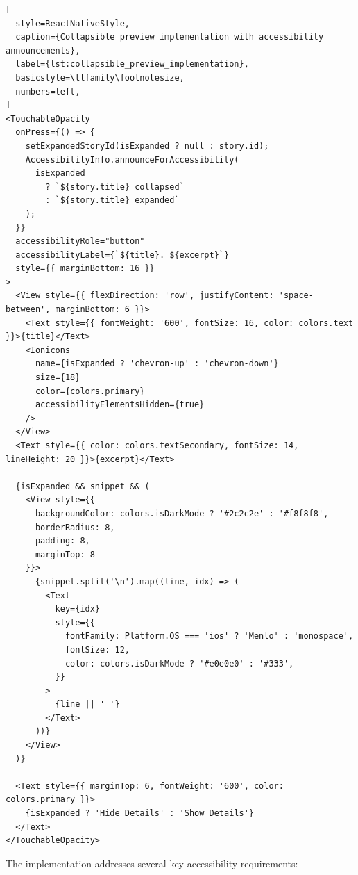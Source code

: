 \begin{lstlisting}[
  style=ReactNativeStyle,
  caption={Collapsible preview implementation with accessibility announcements},
  label={lst:collapsible_preview_implementation},
  basicstyle=\ttfamily\footnotesize,
  numbers=left,
]
<TouchableOpacity
  onPress={() => {
    setExpandedStoryId(isExpanded ? null : story.id);
    AccessibilityInfo.announceForAccessibility(
      isExpanded 
        ? `${story.title} collapsed` 
        : `${story.title} expanded`
    );
  }}
  accessibilityRole="button"
  accessibilityLabel={`${title}. ${excerpt}`}
  style={{ marginBottom: 16 }}
>
  <View style={{ flexDirection: 'row', justifyContent: 'space-between', marginBottom: 6 }}>
    <Text style={{ fontWeight: '600', fontSize: 16, color: colors.text }}>{title}</Text>
    <Ionicons
      name={isExpanded ? 'chevron-up' : 'chevron-down'}
      size={18}
      color={colors.primary}
      accessibilityElementsHidden={true}
    />
  </View>
  <Text style={{ color: colors.textSecondary, fontSize: 14, lineHeight: 20 }}>{excerpt}</Text>

  {isExpanded && snippet && (
    <View style={{
      backgroundColor: colors.isDarkMode ? '#2c2c2e' : '#f8f8f8',
      borderRadius: 8,
      padding: 8,
      marginTop: 8
    }}>
      {snippet.split('\n').map((line, idx) => (
        <Text
          key={idx}
          style={{
            fontFamily: Platform.OS === 'ios' ? 'Menlo' : 'monospace',
            fontSize: 12,
            color: colors.isDarkMode ? '#e0e0e0' : '#333',
          }}
        >
          {line || ' '}
        </Text>
      ))}
    </View>
  )}

  <Text style={{ marginTop: 6, fontWeight: '600', color: colors.primary }}>
    {isExpanded ? 'Hide Details' : 'Show Details'}
  </Text>
</TouchableOpacity>
\end{lstlisting}
\FloatBarrier

The implementation addresses several key accessibility requirements:

